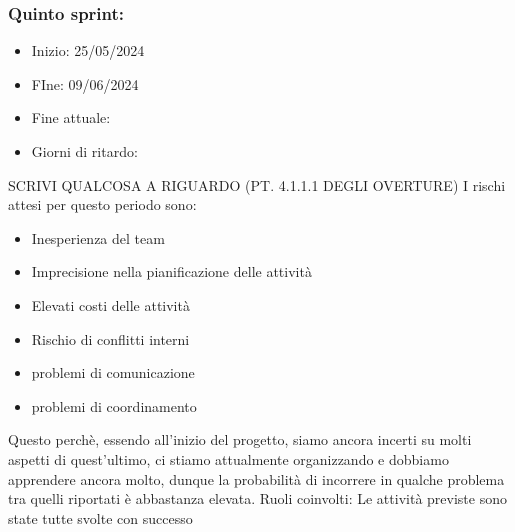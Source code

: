     \subsubsection{Quinto sprint:}
    \begin{itemize}
        \item Inizio: 25/05/2024
        \item FIne: 09/06/2024
        \item Fine attuale:
        \item Giorni di ritardo:
    \end{itemize}
    SCRIVI QUALCOSA A RIGUARDO (PT. 4.1.1.1 DEGLI OVERTURE)
    I rischi attesi per questo periodo sono:
    \begin{itemize}
        \item Inesperienza del team
        \item Imprecisione nella pianificazione delle attività
        \item Elevati costi delle attività
        \item Rischio di conflitti interni 
        \item problemi di comunicazione
        \item problemi di coordinamento
    \end{itemize}
    Questo perchè, essendo all’inizio del progetto, siamo ancora incerti su molti aspetti di quest’ultimo, ci stiamo attualmente organizzando e dobbiamo apprendere ancora molto, dunque la probabilità di incorrere in qualche problema tra quelli riportati è abbastanza elevata.
    Ruoli coinvolti: 
    Le attività previste sono state tutte svolte con successo


